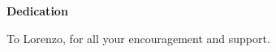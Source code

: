 
\begin{center}\textbf{Dedication}\end{center}
To Lorenzo, for all your encouragement and support.
\cleardoublepage

\renewcommand\contentsname{Table of Contents}
\tableofcontents
\cleardoublepage
{}    %

\listoffigures
\cleardoublepage
{}		%

\listoftables
\cleardoublepage
{}		%


